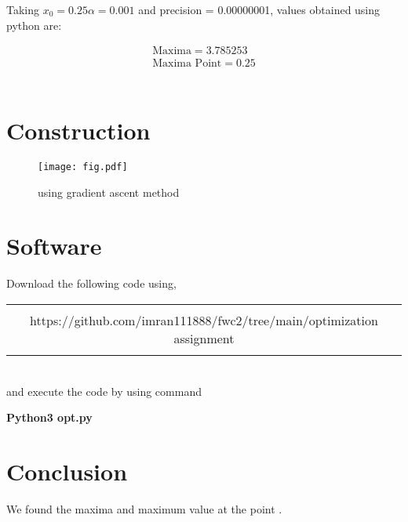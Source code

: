 \documentclass[journal,12pt,twocolumn]{article}
\begin{document}
Taking $x_0=0.25\alpha=0.001$ and precision = 0.00000001, values obtained using python are:
    

    \begin{align}
        \boxed{\text{Maxima} = 3.785253}\\
        \boxed{\text{Maxima Point} = 0.25}
    \end{align}\\
    
   \section{Construction}
\begin{figure}[h]
    \centering
\texttt{[image: fig.pdf]}
    \caption{using gradient ascent method}
   \label{fig:my_label}
\end{figure}

    
\section{Software}
Download the following code using,
\begin{table}[h]
    \centering
    \begin{tabular}{|c|}
    \hline \\
        https://github.com/imran111888/fwc2/tree/main/optimization assignment\\
         \\
\hline
    \end{tabular}
\end{table}
\\
and execute the code by using command
\begin{center}
\textbf{Python3  opt.py}\\
\end{center}

\section{Conclusion}
We found the maxima and maximum value at the point .
\end{document}
